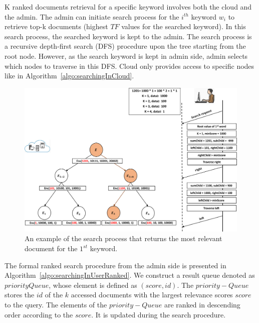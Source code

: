 \documentclass[sigconf,pdftex]{acmart}
\begin{document}
K ranked documents retrieval for a specific keyword involves both the cloud and the admin. The admin can initiate search process for the $i^{th}$ keyword $w_i$ to retrieve top-k documents (highest $TF$ values for the searched keyword). In this search process, the searched keyword is kept to the admin. The search process is a recursive depth-first search (DFS) procedure upon the tree starting from the root node. However, as the search keyword is kept in admin side, admin selects which nodes to traverse in this DFS. Cloud only provides access to specific nodes like in Algorithm~\ref{algo:searchingInCloud}.



\begin{figure}
\includegraphics[width=0.95\linewidth]{pdfs/search-user-cloud.pdf}
\caption{An example of the search process that returns the most relevant document for the $1^{st}$ keyword.}


\label{fig:searching}
\centering
\end{figure}

The formal ranked search procedure from the admin side is presented in Algorithm~\ref{algo:searchingInUserRanked}. We construct a result queue denoted as $priorityQueue$, whose element is defined as $(score, id)$. The $priority-Queue$ stores the $id$ of the $k$ accessed documents with the largest relevance scores $score$ to the query. The elements of the $priority-Queue$ are ranked in descending order according to the $score$. It is updated during the search procedure.


\end{document}
